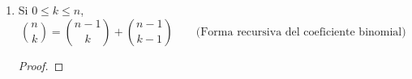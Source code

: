 \begin{enumerate}[label=\alph*)]
  \item Si $0\leq k \leq n$, \[\binom{n}{k} = \binom{n-1}{k} + \binom{n-1}{k-1}\qquad \text{(Forma recursiva del coeficiente binomial)}\]
  \begin{proof}\leavevmode
      

\end{proof}
\end{enumerate}

